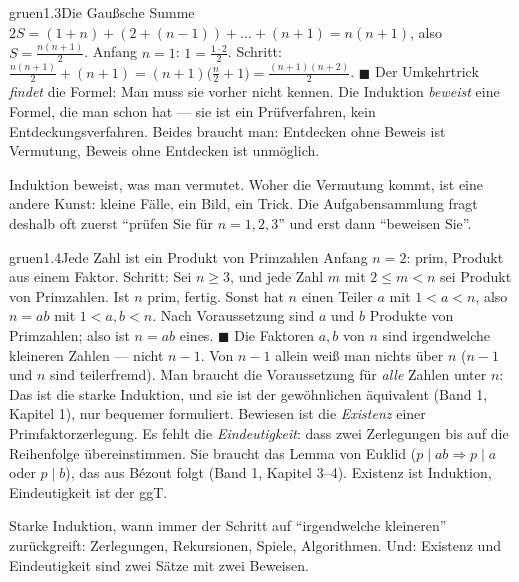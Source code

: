 \begin{loesungkarte}{gruen}{1.3}{Die Gaußsche Summe}
$2S = (1 + n) + (2 + (n - 1)) + \dots + (n + 1) = n(n + 1)$, also $S = \frac{n(n+1)}2$.
Anfang $n = 1$: $1 = \frac{1\cdot2}2$. Schritt: $\frac{n(n+1)}2 + (n + 1) = (n + 1)\bigl(\frac n2 + 1\bigr) = \frac{(n+1)(n+2)}2$. $\blacksquare$
Der Umkehrtrick \emph{findet} die Formel: Man muss sie vorher nicht kennen. Die Induktion \emph{beweist} eine Formel, die man schon hat --- sie ist ein Prüfverfahren, kein Entdeckungsverfahren. Beides braucht man: Entdecken ohne Beweis ist Vermutung, Beweis ohne Entdecken ist unmöglich.
\begin{mitnehmen}\kastentext
Induktion beweist, was man vermutet. Woher die Vermutung kommt, ist eine andere Kunst: kleine Fälle, ein Bild, ein Trick. Die Aufgabensammlung fragt deshalb oft zuerst \enquote{prüfen Sie für $n = 1, 2, 3$} und erst dann \enquote{beweisen Sie}.
\end{mitnehmen}
\end{loesungkarte}

\begin{loesungkarte}{gruen}{1.4}{Jede Zahl ist ein Produkt von Primzahlen}
Anfang $n = 2$: prim, Produkt aus einem Faktor. Schritt: Sei $n\ge3$, und jede Zahl $m$ mit $2\le m < n$ sei Produkt von Primzahlen. Ist $n$ prim, fertig. Sonst hat $n$ einen Teiler $a$ mit $1 < a < n$, also $n = ab$ mit $1 < a, b < n$. Nach Voraussetzung sind $a$ und $b$ Produkte von Primzahlen; also ist $n = ab$ eines. $\blacksquare$
Die Faktoren $a, b$ von $n$ sind irgendwelche kleineren Zahlen --- nicht $n - 1$. Von $n - 1$ allein weiß man nichts über $n$ ($n - 1$ und $n$ sind teilerfremd). Man braucht die Voraussetzung für \emph{alle} Zahlen unter $n$: Das ist die starke Induktion, und sie ist der gewöhnlichen äquivalent (Band 1, Kapitel 1), nur bequemer formuliert.
Bewiesen ist die \emph{Existenz} einer Primfaktorzerlegung. Es fehlt die \emph{Eindeutigkeit}: dass zwei Zerlegungen bis auf die Reihenfolge übereinstimmen. Sie braucht das Lemma von Euklid ($p\mid ab\Rightarrow p\mid a$ oder $p\mid b$), das aus Bézout folgt (Band 1, Kapitel 3--4). Existenz ist Induktion, Eindeutigkeit ist der ggT.
\begin{mitnehmen}\kastentext
Starke Induktion, wann immer der Schritt auf \enquote{irgendwelche kleineren} zurückgreift: Zerlegungen, Rekursionen, Spiele, Algorithmen. Und: Existenz und Eindeutigkeit sind zwei Sätze mit zwei Beweisen.
\end{mitnehmen}
\end{loesungkarte}

